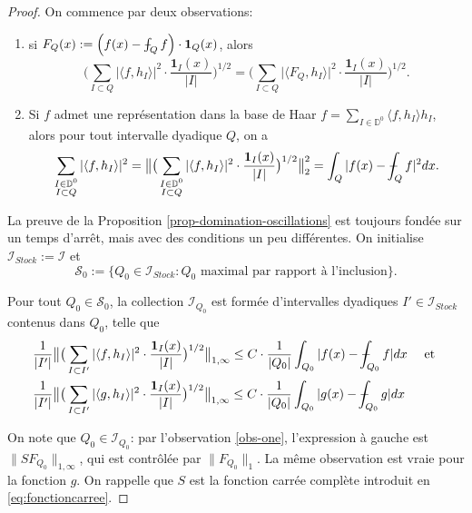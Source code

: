 \documentclass[11pt]{amsart}
\newcommand{\one}{\mathbf{1}}
\newcommand{\ii}{\mathscr}
\newcommand{\ic}{\mathcal}
\newcommand{\ds}{\displaystyle}
\newcommand{\Dy}{{\mathbb D}}
\def\Xint#1{\mathchoice
   {\XXint\displaystyle\textstyle{#1}}%
   {\XXint\textstyle\scriptstyle{#1}}%
   {\XXint\scriptstyle\scriptscriptstyle{#1}}%
   {\XXint\scriptscriptstyle\scriptscriptstyle{#1}}%
   \!\int}
\def\XXint#1#2#3{{\setbox0=\hbox{$#1{#2#3}{\int}$}
     \vcenter{\hbox{$#2#3$}}\kern-.5\wd0}}
\def\aver#1{\Xint-_{#1}}
\begin{document}
\begin{proof}
On commence par deux observations:
\begin{enumerate}[label=(\roman*), ref=\roman*]
\item \label{obs-one} si $F_Q(x):= \left( f(x) -\aver{Q} f \right) \cdot \one_Q(x)$, alors
\[
\big(  \sum_{I \subset Q } \vert \langle f, h_I \rangle  \vert^2 \cdot \frac{\one_I(x)}{\vert  I \vert}   \big)^{1/2}= \big(  \sum_{I \subset Q } \vert \langle F_Q, h_I \rangle  \vert^2 \cdot \frac{\one_I(x)}{\vert  I \vert}   \big)^{1/2}.
\]
\item \label{obs-two} Si $f$ admet une repr\'esentation dans la base de Haar $\ds f=\sum_{I \in \Dy^0} \langle f, h_I  \rangle h_I$, alors pour tout intervalle dyadique $Q$, on a
\[
\sum_{\substack{I \in \Dy^0 \\  I \subset Q }} \vert \langle f, h_I  \rangle \vert^2= \big\|  \big(  \sum_{\substack{I \in \Dy^0 \\  I \subset Q }} \vert \langle f, h_I \rangle  \vert^2 \cdot \frac{\one_I(x)}{\vert  I \vert}   \big)^{1/2} \big\|_2^2 = \int_Q \vert  f(x) -\aver{Q} f \vert^2 dx.   
\]
\end{enumerate}

La preuve de la Proposition \ref{prop-domination-oscillations} est toujours fond\'ee sur un temps d'arr\^et, mais avec des conditions un peu diff\'erentes. On initialise  $\ii I_{Stock}:=\ii I$ et $$\ic S_0:=\lbrace Q_0 \in \ii I_{Stock} : Q_0 \text{ maximal par rapport \`a l'inclusion}  \rbrace.$$

Pour tout $Q_0 \in \ic S_0$, la collection $\ii I_{Q_0}$ est form\'ee d'intervalles dyadiques $I' \in \ii I_{Stock}$ contenus dans $Q_0$, telle que
\begin{align*}
&\frac{1}{\vert I' \vert} \big\|  \big(  \sum_{I \subset I' } \vert \langle f, h_I \rangle  \vert^2 \cdot \frac{\one_I(x)}{\vert  I \vert}   \big)^{1/2} \big\|_{1, \infty} \leq C \cdot \frac{1}{\vert Q_0 \vert} \int_{Q_0} \vert  f(x) -\aver{Q_0} f \vert dx \quad \text{ et }\\
&\frac{1}{\vert I' \vert} \big\|  \big(  \sum_{I \subset I' } \vert \langle g, h_I \rangle  \vert^2 \cdot \frac{\one_I(x)}{\vert  I \vert}   \big)^{1/2} \big\|_{1, \infty} \leq C \cdot \frac{1}{\vert Q_0 \vert} \int_{Q_0} \vert  g(x) -\aver{Q_0} g \vert dx
\end{align*}

On note que $Q_0 \in \ii I_{Q_0}$: par l'observation \eqref{obs-one}, l'expression \`a gauche est $\|  S F_{Q_0}  \|_{1, \infty}$, qui est contrôl\'ee par $\| F_{Q_0}  \|_1$. La m\^eme observation est vraie pour la fonction $g$. On rappelle que $S$ est la fonction carr\'ee compl\`ete introduit en \eqref{eq:fonctioncarree}.


\end{proof}
\end{document}
